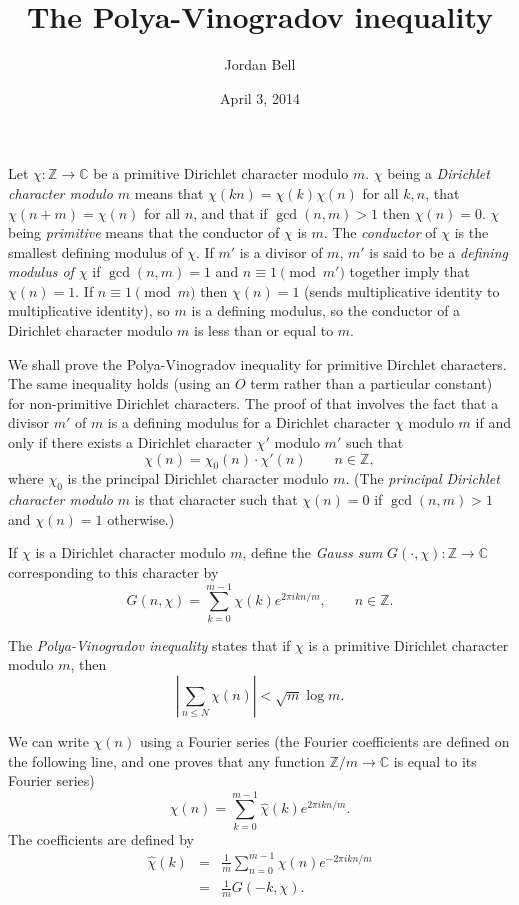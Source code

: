 \documentclass{article}
\begin{document}
\title{The Polya-Vinogradov inequality}
\author{Jordan Bell}
\date{April 3, 2014}

\maketitle

Let $\chi:\mathbb{Z} \to \mathbb{C}$ be a primitive Dirichlet character modulo $m$. $\chi$ being a {\em Dirichlet character modulo $m$} means that $\chi(kn)=\chi(k)\chi(n)$ for all $k,n$, that
$\chi(n+m)=\chi(n)$ for all $n$, and that if $\gcd(n,m)>1$ then $\chi(n)=0$. $\chi$ being {\em primitive} means that the conductor of $\chi$ is $m$. The {\em conductor} of
$\chi$ is the smallest defining modulus of $\chi$. If $m'$ is a divisor of $m$, $m'$ is said to be a {\em defining modulus of $\chi$} if $\gcd(n,m)=1$ and $n \equiv 1 \pmod{m'}$ together imply
that $\chi(n)=1$. If $n \equiv 1 \pmod{m}$ then $\chi(n)=1$ (sends multiplicative identity to multiplicative identity), so $m$ is a defining modulus, so the conductor of a Dirichlet character modulo $m$ is less than or equal to $m$.

We shall prove the Polya-Vinogradov inequality for primitive Dirchlet characters. The same inequality holds (using an $O$ term rather than a particular constant) for non-primitive Dirichlet
characters. The proof of that involves the fact \cite[p.~152, Proposition~8]{schoiss} that a divisor $m'$ of $m$ is a defining modulus for a Dirichlet character $\chi$ modulo $m$ if and only if there
exists a Dirichlet character $\chi'$ modulo $m'$ such that 
\[
\chi(n)=\chi_0(n) \cdot \chi'(n) \qquad n \in \mathbb{Z},
\]
where $\chi_0$ is the principal Dirichlet character modulo $m$. (The {\em principal Dirichlet character modulo $m$} is that character such that $\chi(n)=0$ if $\gcd(n,m)>1$ and 
$\chi(n)=1$ otherwise.)

If $\chi$ is a Dirichlet character modulo $m$, define the {\em Gauss sum} $G(\cdot,\chi):\mathbb{Z} \to \mathbb{C}$ corresponding to this character by
\[
G(n,\chi)=\sum_{k=0}^{m-1} \chi(k) e^{2\pi ikn/m}, \qquad n \in \mathbb{Z}.
\]

The {\em Polya-Vinogradov inequality} states that if $\chi$ is a primitive Dirichlet character modulo $m$, then
\[
\left| \sum_{n \leq N} \chi(n) \right| < \sqrt{m} \log m.
\]

We can write $\chi(n)$ using a Fourier series (the Fourier coefficients are defined on the following line, and one proves that any function $\mathbb{Z}/m \to \mathbb{C}$ is
equal to its Fourier series)
\[
\chi(n)=\sum_{k=0}^{m-1} \hat{\chi}(k)e^{2\pi ikn/m}.
\]
The coefficients are defined by
\begin{eqnarray*}
\hat{\chi}(k)&=&\frac{1}{m}\sum_{n=0}^{m-1} \chi(n) e^{-2\pi ikn/m}\\
&=&\frac{1}{m}G(-k,\chi).
\end{eqnarray*}
\end{document}
